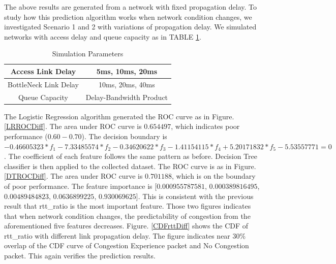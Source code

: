 \par The above results are generated from a network with fixed propagation delay. To study how this prediction algorithm works when network condition changes, we investigated Scenario 1 and 2 with variations of propagation delay. We simulated networks with access delay and queue capacity as in TABLE \ref{tab:varyRTT}.
\begin{table}
\begin{center}
\caption {Simulation Parameters} \label{tab:varyRTT}
\begin{tabular}{ |c|c| }
 \hline
 Access Link Delay & 5ms, 10ms, 20ms  \\
 \hline
 BottleNeck Link Delay & 10ms, 20ms, 40ms\\
 \hline
 Queue Capacity & Delay-Bandwidth Product\\
 \hline
\end{tabular}
\end{center}
\end{table}
The Logistic Regression algorithm generated the ROC curve as in Figure. \ref{LRROCDiff}. The area under ROC curve is $0.654497$, which indicates poor performance ($0.60-0.70$). The decision boundary is $ -0.46605323*f_{1} - 7.33485574*f_{2} - 0.34620622
*f_{3} - 1.41154115*f_{4} + 5.20171832*f_{5} - 5.53557771 = 0$. The coefficient of each feature follows the same pattern as before. Decision Tree classifier is then applied to the collected dataset. The ROC curve is as in Figure. \ref{DTROCDiff}. The area under ROC curve is $0.701188$, which is on the boundary of poor performance. The feature importance is [$0.000955787581$, $0.000389816495$, $0.00489484823$, $0.0636899225$, $0.930069625$]. This is consistent with the previous result that rtt\_ratio is the most important feature. Those two figures indicates that when network condition changes, the predictability of congestion from the aforementioned five features decreases. Figure. \ref{CDFrttDiff} shows the CDF of rtt\_ratio with different link propagation delay. The figure indicates near $30\%$ overlap of the CDF curve of Congestion Experience packet and No Congestion packet. This again verifies the prediction results.
